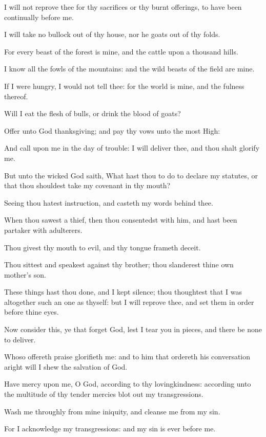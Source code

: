 \Verse I will not reprove thee for thy sacrifices or thy burnt offerings, to have been continually before me.

\Verse I will take no bullock out of thy house, nor he goats out of thy folds.

\Verse For every beast of the forest is mine, and the cattle upon a thousand hills.

\Verse I know all the fowls of the mountains: and the wild beasts of the field are mine.

\Verse If I were hungry, I would not tell thee: for the world is mine, and the fulness thereof.

\Verse Will I eat the flesh of bulls, or drink the blood of goats?

\Verse Offer unto God thanksgiving; and pay thy vows unto the most High:

\Verse And call upon me in the day of trouble: I will deliver thee, and thou shalt glorify me.

\Verse But unto the wicked God saith, What hast thou to do to declare my statutes, or that thou shouldest take my covenant in thy mouth?

\Verse Seeing thou hatest instruction, and casteth my words behind thee.

\Verse When thou sawest a thief, then thou consentedst with him, and hast been partaker with adulterers.

\Verse Thou givest thy mouth to evil, and thy tongue frameth deceit.

\Verse Thou sittest and speakest against thy brother; thou slanderest thine own mother's son.

\Verse These things hast thou done, and I kept silence; thou thoughtest that I was altogether such an one as thyself: but I will reprove thee, and set them in order before thine eyes.

\Verse Now consider this, ye that forget God, lest I tear you in pieces, and there be none to deliver.

\Verse Whoso offereth praise glorifieth me: and to him that ordereth his conversation aright will I shew the salvation of God.




\Chapter
\Verse Have mercy upon me, O God, according to thy lovingkindness: according unto the multitude of thy tender mercies blot out my transgressions.

\Verse Wash me throughly from mine iniquity, and cleanse me from my sin.

\Verse For I acknowledge my transgressions: and my sin is ever before me.

